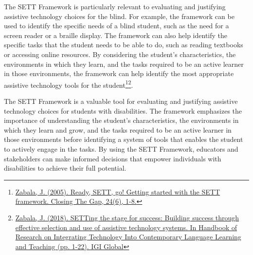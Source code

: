 The SETT Framework is particularly relevant to evaluating and justifying assistive technology choices for the blind. For example, the framework can be used to identify the specific needs of a blind student, such as the need for a screen reader or a braille display. The framework can also help identify the specific tasks that the student needs to be able to do, such as reading textbooks or accessing online resources. By considering the student’s characteristics, the environments in which they learn, and the tasks required to be an active learner in those environments, the framework can help identify the most appropriate assistive technology tools for the student\footnote{\raggedright \href{https://www.joyzabala.com/uploads/1/0/9/0/109073507/ready_sett_go.pdf}{Zabala, J. (2005). Ready, SETT, go! Getting started with the SETT framework. Closing The Gap, 24(6), 1-8.} }\fnsep\footnote{\raggedright \href{https://www.researchgate.net/profile/Joy-Zabala/publication/237798275_SETTing_the_Stage_for_Success_Building_Success_through_Effective_Selection_and_Use_of_Assistive_Technology_Systems/links/56452b9208aef646e6cc24d9/SETTing-the-Stage-for-Success-Building-Success-through-Effective-Selection-and-Use-of-Assistive-Technology-Systems.pdf?origin=publication_detail}{Zabala, J. (2018). SETTing the stage for success: Building success through effective selection and use of assistive technology systems. In Handbook of Research on Integrating Technology Into Contemporary Language Learning and Teaching (pp. 1-22). IGI Global}}.

The SETT Framework is a valuable tool for evaluating and justifying assistive technology choices for students with disabilities. The framework emphasizes the importance of understanding the student’s characteristics, the environments in which they learn and grow, and the tasks required to be an active learner in those environments before identifying a system of tools that enables the student to actively engage in the tasks. By using the SETT Framework, educators and stakeholders can make informed decisions that empower individuals with disabilities to achieve their full potential.

